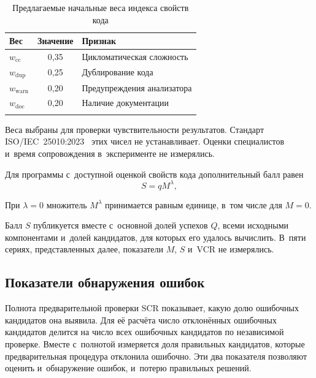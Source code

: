 \begin{table}[!ht]
\caption{Предлагаемые начальные веса индекса свойств кода}
\label{tab:weights}
\centering\small\renewcommand{\arraystretch}{1.2}
\begin{tabularx}{\textwidth}{@{}lc>{\raggedright\arraybackslash}X@{}}
\toprule
Вес & Значение & Признак \\
\midrule
$w_{\mathrm{cc}}$ & 0,35 & Цикломатическая сложность \\
$w_{\mathrm{dup}}$ & 0,25 & Дублирование кода \\
$w_{\mathrm{warn}}$ & 0,20 & Предупреждения анализатора \\
$w_{\mathrm{doc}}$ & 0,20 & Наличие документации \\
\botrule
\end{tabularx}
\end{table}
\FloatBarrier

Веса выбраны для проверки чувствительности результатов. Стандарт ISO/IEC~25010:2023~\cite{iso25010} этих чисел не устанавливает. Оценки специалистов и~время сопровождения в~эксперименте не измерялись.

\begin{formulakey}
Для программы с~доступной оценкой свойств кода дополнительный балл равен
\[
S=qM^{\lambda},
\]
\begin{symbols}
\end{symbols}
\end{formulakey}
При $\lambda=0$ множитель $M^{\lambda}$ принимается равным единице, в~том числе для $M=0$.

Балл $S$ публикуется вместе с~основной долей успехов $Q$, всеми исходными компонентами и~долей кандидатов, для которых его удалось вычислить. В~пяти сериях, представленных далее, показатели $M$, $S$ и~VCR не измерялись. 

\subsection{Показатели обнаружения ошибок}
Полнота предварительной проверки $\mathrm{SCR}$ показывает, какую долю ошибочных кандидатов она выявила. Для её расчёта число отклонённых ошибочных кандидатов делится на число всех ошибочных кандидатов по независимой проверке. Вместе с~полнотой измеряется доля правильных кандидатов, которые предварительная процедура отклонила ошибочно. Эти два показателя позволяют оценить и~обнаружение ошибок, и~потерю правильных решений.

